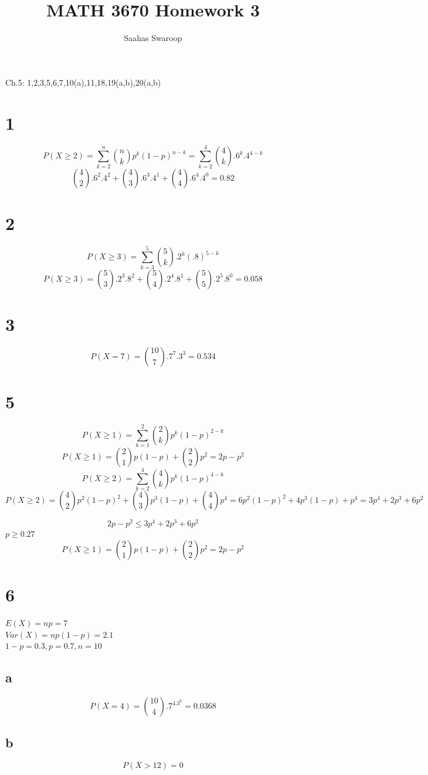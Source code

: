 \documentclass[12pt]{article}
\title{\textbf{MATH 3670 Homework 3}}
\author{Saahas Swaroop}
\begin{document}
  \maketitle
  \pagebreak

  Ch.5: 1,2,3,5,6,7,10(a),11,18,19(a,b),20(a,b)

  \section*{1}
  $$P(X \geq 2) = \sum_{k=2}^{n} \binom{n}{k} p^k (1-p)^{n-k} = \sum_{k=2}^{4} \binom{4}{k} .6^k .4^{4-k}$$
  $$ \binom{4}{2} .6^2 .4^2 + \binom{4}{3} .6^3 .4^1 + \binom{4}{4} .6^4 .4^0 = 0.82$$
  \section*{2}
  $$P(X \geq 3) = \sum_{k=3}^{5} \binom{5}{k} .2^k (.8)^{5-k}$$
  $$P(X \geq 3) = \binom{5}{3} .2^3 .8^2 + \binom{5}{4} .2^4 .8^1 +\binom{5}{5} .2^5 .8^0 = 0.058$$ 
  \section*{3}
  $$P(X = 7) = \binom{10}{7} .7^7 .3^3 = 0.534$$
  \section*{5}
  $$P(X\geq 1) = \sum_{k=1}^{2} \binom{2}{k} p^k(1-p)^{2-k} $$
  $$P(X\geq 1) = \binom{2}{1} p(1-p) + \binom{2}{2} p^2 = 2p - p^2$$
  $$P(X\geq 2) = \sum_{k=2}^{4} \binom{4}{k} p^k(1-p)^{4-k}$$
  $$P(X\geq 2) = \binom{4}{2} p^2(1-p)^2 + \binom{4}{3} p^3(1-p) + \binom{4}{4} p^4 = 6p^2(1-p)^2 + 4p^3(1-p) + p^4 = 3p^4 + 2p^3 + 6p^2$$

  $$ 2p - p^2 \leq 3p^4 + 2p^3 + 6p^2$$
  $p \geq 0.27$
  $$P(X\geq 1) = \binom{2}{1} p(1-p) + \binom{2}{2} p^2 = 2p - p^2$$

  \section*{6}
  $E(X) = np = 7$ \\
  $Var(X) = np(1-p) = 2.1$ \\
  $1-p = 0.3, p = 0.7, n=10$ \\
  \subsection*{a}
  $$P(X=4) = \binom{10}{4} .7^4.3^6 = 0.0368$$
  \subsection*{b}
  $$P(X>12) = 0$$
\end{document}
